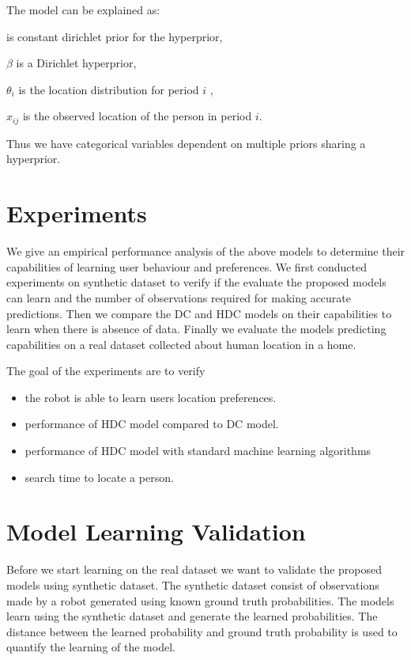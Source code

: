 The model can be explained as:

	\boldmath{$\alpha$} is  constant dirichlet prior for the hyperprior, 
	
	$\beta$ is a Dirichlet hyperprior,
	
	$\theta_i$ is the location distribution for period $i$  ,
	
	$x_{ij}$ is the observed location of the person in period $i$.
	
Thus we have categorical variables dependent on multiple priors sharing a hyperprior.


\section{Experiments}

We give an empirical performance analysis of the above models to determine their capabilities of learning user behaviour and preferences. We first conducted experiments on synthetic dataset to verify if the evaluate the proposed models can learn and the number of observations required for making accurate predictions. Then we compare the DC and HDC models on their capabilities to learn when there is absence of data. Finally we evaluate the models predicting capabilities on a real dataset collected about human location in a home.

The goal of the experiments are to verify 
\begin{itemize}
	\item the robot is able to learn users location preferences.
	\item performance of HDC model compared to DC model.
	\item performance of HDC model with standard machine learning algorithms
	\item search time to locate a person.
\end{itemize}


\section{Model Learning Validation}

Before we start learning on the real dataset we want to validate the proposed models using synthetic dataset. The synthetic dataset consist of observations made by a robot generated using known ground truth probabilities. The models learn using the synthetic dataset and generate the learned probabilities. The distance between the learned probability and ground truth probability is used to quantify the learning of the model. 

